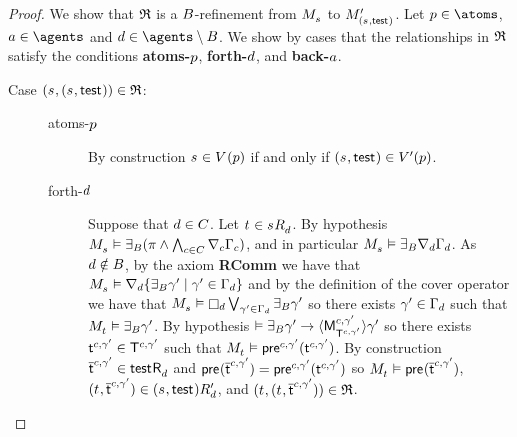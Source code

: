 \begin{proof}
We show that $\refinement$ is a $\agentsB$-refinement from $\kPModel{\kStateS}$ to $\kPModelP{(\kStateS, \aStateTest)}$.
Let $\atomP \in \atoms$, $\agentA \in \agents$ and $\agentD \in \agents \setminus \agentsB$.
We show by cases that the relationships in $\refinement$ satisfy the conditions {\bf atoms-$\atomP$}, {\bf forth-$\agentD$}, and {\bf back-$\agentA$}.

\begin{description}
    \item[{Case $(\kStateS, (\kStateS, \aStateTest)) \in \refinement$:}] \hfill
        \begin{description}
            \item[atoms-$\atomP$]
                By construction $\kStateS \in \kValuation(\atomP)$ if and only if $(\kStateS, \aStateTest) \in \kValuationP(\atomP)$.
            \item[forth-$\agentD$]
                Suppose that $\agentD \in \agentsC$.
                Let $\kStateT \in \kSuccessorsD{\kStateS}$.
                By hypothesis $\kPModel{\kStateS} \entails \someactsBs (\pi \land \bigwedge_{\agentC \in \agentsC} \coversC \Gamma_\agentC)$, and in particular $\kPModel{\kStateS} \entails \someactsBs \coversD \Gamma_\agentD$.
                As $\agentD \notin \agentsB$, by the \axiomAamlKFF{} axiom {\bf RComm} we have that $\kPModel{\kStateS} \entails \coversD \{\someactsBs \gamma' \mid \gamma' \in \Gamma_\agentD\}$ and by the definition of the cover operator we have that $\kPModel{\kStateS} \entails \necessaryD \bigvee_{\gamma' \in \Gamma_\agentD} \someactsBs \gamma'$ so there exists $\gamma' \in \Gamma_\agentD$ such that $\kPModel{\kStateT} \entails \someactsBs \gamma'$.
                By hypothesis $\entails \someactsBs \gamma' \implies \actionE{\aPModel[\agentC, \gamma']{\aStatesT[\agentC, \gamma']}} \gamma'$ so there exists $\aStateT[\agentC, \gamma'] \in \aStatesT[\agentC, \gamma']$ such that $\kPModel{\kStateT} \entails \aPrecondition[\agentC, \gamma'](\aStateT[\agentC, \gamma'])$.
                By construction $\aPStateT[\agentC, \gamma'] \in \aSuccessorsD{\aStateTest}$ and $\aPrecondition(\aPStateT[\agentC, \gamma']) = \aPrecondition[\agentC, \gamma'](\aStateT[\agentC, \gamma'])$ so $\kPModel{\kStateT} \entails \aPrecondition(\aPStateT[\agentC, \gamma'])$, $(\kStateT, \aPStateT[\agentC, \gamma']) \in \kSuccessorsPD{(\kStateS, \aStateTest)}$, and $(\kStateT, (\kStateT, \aPStateT[\agentC, \gamma'])) \in \refinement$.


\end{description}
\end{description}
\end{proof}
